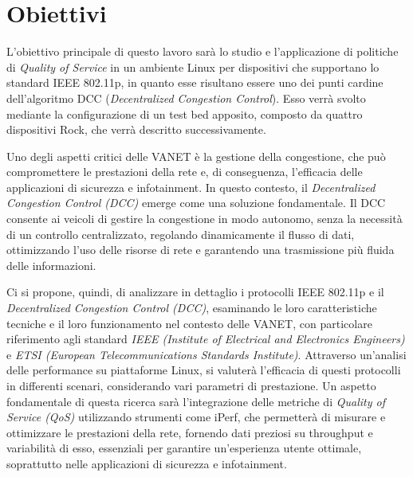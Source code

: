 \section{Obiettivi}
L'obiettivo principale di questo lavoro sarà lo studio e l'applicazione di politiche di \textit{Quality of Service} in un ambiente Linux per dispositivi che supportano lo standard IEEE 802.11p, in quanto esse risultano essere uno dei punti cardine dell'algoritmo DCC (\textit{Decentralized Congestion Control}). Esso verrà svolto mediante la configurazione di un test bed apposito, composto da quattro dispositivi Rock, che verrà descritto successivamente.

Uno degli aspetti critici delle VANET è la gestione della congestione, che può compromettere le prestazioni della rete e, di conseguenza, l'efficacia delle applicazioni di sicurezza e infotainment. In questo contesto, il \textit{Decentralized Congestion Control (DCC)} emerge come una soluzione fondamentale. Il DCC consente ai veicoli di gestire la congestione in modo autonomo, senza la necessità di un controllo centralizzato, regolando dinamicamente il flusso di dati, ottimizzando l'uso delle risorse di rete e garantendo una trasmissione più fluida delle informazioni.

Ci si propone, quindi, di analizzare in dettaglio i protocolli IEEE 802.11p e il \textit{Decentralized Congestion Control (DCC)}, esaminando le loro caratteristiche tecniche e il loro funzionamento nel contesto delle VANET, con particolare riferimento agli standard \textit{IEEE (Institute of Electrical and Electronics Engineers)} e \textit{ETSI (European Telecommunications Standards Institute)}. Attraverso un'analisi delle performance su piattaforme Linux, si valuterà l'efficacia di questi protocolli in differenti scenari, considerando vari parametri di prestazione. Un aspetto fondamentale di questa ricerca sarà l'integrazione delle metriche di \textit{Quality of Service (QoS)} utilizzando strumenti come iPerf, che permetterà di misurare e ottimizzare le prestazioni della rete, fornendo dati preziosi su throughput e variabilità di esso, essenziali per garantire un'esperienza utente ottimale, soprattutto nelle applicazioni di sicurezza e infotainment.